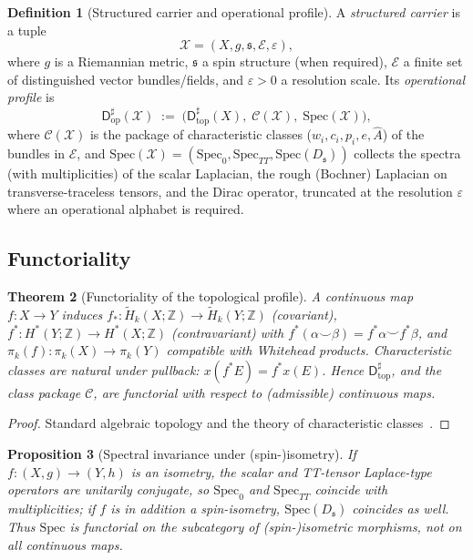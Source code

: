 \documentclass[11pt,a4paper]{article}
\newtheorem{theorem}{Theorem}[section]
\newtheorem{proposition}[theorem]{Proposition}
\theoremstyle{definition}
\newtheorem{definition}[theorem]{Definition}
\theoremstyle{remark}
\newcommand{\Z}{\mathbb{Z}}
\newcommand{\rH}{\widetilde H}
\newcommand{\Dtop}{\mathsf{D}^{\sharp}_{\mathrm{top}}}
\newcommand{\Dop}{\mathsf{D}^{\sharp}_{\mathrm{op}}}
\begin{document}
\begin{definition}[Structured carrier and operational profile]
\label{def:dop}
A \emph{structured carrier} is a tuple
\begin{equation}
\mathcal X=(X,g,\mathfrak s,\mathcal E,\varepsilon),
\end{equation}
where $g$ is a Riemannian metric, $\mathfrak s$ a spin structure (when required),
$\mathcal E$ a finite set of distinguished vector bundles/fields, and $\varepsilon>0$ a
resolution scale.  Its \emph{operational profile} is
\begin{equation}
\Dop(\mathcal X)\;:=\;
\Big(
\Dtop(X),\;
\mathcal C(\mathcal X),\;
\mathrm{Spec}(\mathcal X)
\Big),
\end{equation}
where $\mathcal C(\mathcal X)$ is the package of characteristic classes
($w_{i},c_{i},p_{i},e,\hat A$) of the bundles in $\mathcal E$, and
$\mathrm{Spec}(\mathcal X)=(\mathrm{Spec}_{0},\mathrm{Spec}_{TT},\mathrm{Spec}(D_{\mathfrak s}))$
collects the spectra (with multiplicities) of the scalar Laplacian, the rough (Bochner)
Laplacian on transverse-traceless tensors, and the Dirac operator, truncated at the resolution $\varepsilon$ where
an operational alphabet is required.
\end{definition}

\subsection{Functoriality}

\begin{theorem}[Functoriality of the topological profile]
\label{thm:functorial}
A continuous map $f:X\to Y$ induces
$f_{\ast}:\rH_{k}(X;\Z)\to\rH_{k}(Y;\Z)$ (covariant),
$f^{\ast}:H^{\ast}(Y;\Z)\to H^{\ast}(X;\Z)$ (contravariant) with
$f^{\ast}(\alpha\smile\beta)=f^{\ast}\alpha\smile f^{\ast}\beta$, and
$\pi_{k}(f):\pi_{k}(X)\to\pi_{k}(Y)$ compatible with Whitehead products.  Characteristic
classes are natural under pullback: $x(f^{\ast}E)=f^{\ast}x(E)$.  Hence $\Dtop$, and the class
package $\mathcal C$, are functorial with respect to (admissible) continuous maps.
\end{theorem}

\begin{proof}
Standard algebraic topology and the theory of characteristic
classes~\cite{Hatcher2002,MilnorStasheff}.
\end{proof}

\begin{proposition}[Spectral invariance under (spin-)isometry]
\label{prop:spec}
If $f:(X,g)\to(Y,h)$ is an isometry, the scalar and TT-tensor Laplace-type operators are unitarily
conjugate, so $\mathrm{Spec}_{0}$ and $\mathrm{Spec}_{TT}$ coincide with multiplicities; if $f$
is in addition a spin-isometry, $\mathrm{Spec}(D_{\mathfrak s})$ coincides as well.  Thus
$\mathrm{Spec}$ is functorial on the subcategory of (spin-)isometric morphisms, not on all
continuous maps.
\end{proposition}
\end{document}

